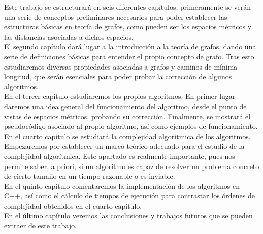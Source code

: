 Este trabajo se estructurará en seis diferentes capítulos, primeramente se verán una serie de conceptos preliminares necesarios para poder establecer las estructuras básicas en teoría de grafos, como pueden ser los espacios métricos y las distancias asociadas a dichos espacios. \\

El segundo capítulo dará lugar a la introducción a la teoría de grafos, dando una serie de definiciones básicas para entender el propio concepto de grafo. Tras esto estudiaremos diversas propiedades asociadas a grafos y caminos de mínima longitud, que serán esenciales para poder probar la corrección de algunos algoritmos. \\

En el tercer capítulo estudiaremos los propios algoritmos. En primer lugar daremos una idea general del funcionamiento del algoritmo, desde el punto de vistas de espacios métricos, probando su corrección. Finalmente, se mostrará el pseudocódigo asociado al propio algoritmo, así como ejemplos de funcionamiento. \\

En el cuarto capítulo se estudiará la complejidad algorítmica de los algoritmos. Empezaremos por establecer un marco teórico adecuado para el estudio de la complejidad algorítmica. Este apartado es realmente importante, pues nos permite saber, a priori, si un algoritmo es capaz de resolver un problema concreto de cierto tamaño en un tiempo razonable o es inviable. \\

En el quinto capítulo comentaremos la implementación de los algoritmos en C++, así como el cálculo de tiempos de ejecución para contrastar los órdenes de complejidad obtenidos en el cuarto capítulo. \\

En el último capítulo veremos las conclusiones y trabajos futuros que se pueden extraer de este trabajo.


\endinput
